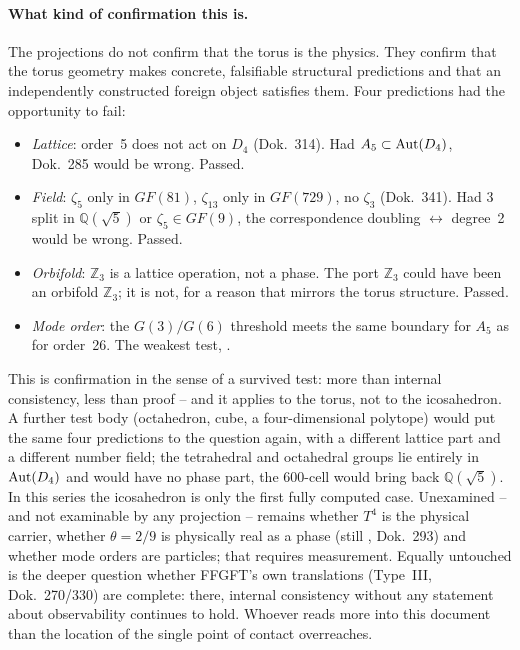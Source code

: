 \paragraph{What kind of confirmation this is.} The projections do not
confirm that the torus is the physics. They confirm that the torus
geometry makes concrete, falsifiable structural predictions and that an
independently constructed foreign object satisfies them. Four predictions
had the opportunity to fail:
\begin{itemize}[nosep]
\item \emph{Lattice}: order~5 does not act on $D_4$ (Dok.~314). Had
      $A_5\subset{\rm Aut}(D_4)$, Dok.~285 would be wrong. Passed.
\item \emph{Field}: $\zeta_5$ only in $GF(81)$, $\zeta_{13}$ only in
      $GF(729)$, no $\zeta_3$ (Dok.~341). Had $3$ split in $\mathbb{Q}(\sqrt5)$
      or $\zeta_5\in GF(9)$, the correspondence doubling $\leftrightarrow$
      degree~2 would be wrong. Passed.
\item \emph{Orbifold}: $\mathbb{Z}_3$ is a lattice operation, not a phase.
      The port $\mathbb{Z}_3$ could have been an orbifold $\mathbb{Z}_3$; it is
      not, for a reason that mirrors the torus structure. Passed.
\item \emph{Mode order}: the $G(3)/G(6)$ threshold meets the same boundary
      for $A_5$ as for order~26. The weakest test, \SM.
\end{itemize}
This is confirmation in the sense of a survived test: more than internal
consistency, less than proof -- and it applies to the torus, not to the
icosahedron. A further test body (octahedron, cube, a four-dimensional
polytope) would put the same four predictions to the question again, with
a different lattice part and a different number field; the tetrahedral and
octahedral groups lie entirely in ${\rm Aut}(D_4)$ and would have no phase
part, the $600$-cell would bring back $\mathbb{Q}(\sqrt5)$. In this series
the icosahedron is only the first fully computed case. Unexamined -- and not examinable by any
projection -- remains whether $T^4$ is the physical carrier, whether
$\theta=2/9$ is physically real as a phase (still \KM, Dok.~293) and
whether mode orders are particles; that requires measurement. Equally
untouched is the deeper question whether FFGFT's own translations
(Type~III, Dok.~270/330) are complete: there, internal consistency without
any statement about observability continues to hold. Whoever reads more
into this document than the location of the single point of contact
overreaches.

